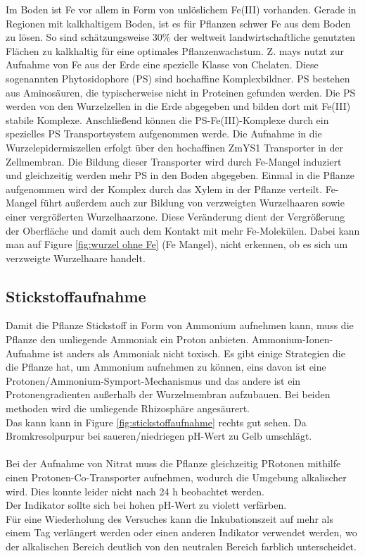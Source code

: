 \documentclass[10pt,a4paper]{article}
\begin{document}
	Im Boden ist Fe vor allem in Form von unlöslichem Fe(III) vorhanden. Gerade in Regionen mit kalkhaltigem Boden, ist es für Pflanzen schwer Fe aus dem Boden zu lösen. So sind schätzungsweise 30$\%$ der weltweit landwirtschaftliche genutzten Flächen zu kalkhaltig für eine optimales Pflanzenwachstum\cite{Barker}. Z. mays nutzt zur Aufnahme von Fe aus der Erde eine spezielle Klasse von Chelaten. Diese sogenannten Phytosidophore (PS) sind hochaffine Komplexbildner. PS bestehen aus Aminosäuren, die typischerweise nicht in Proteinen gefunden werden. Die PS werden von den Wurzelzellen in die Erde abgegeben und bilden dort mit Fe(III) stabile Komplexe. Anschließend können die PS-Fe(III)-Komplexe durch ein spezielles PS Transportsystem aufgenommen werde\cite{Taiz}. Die Aufnahme in die Wurzelepidermiszellen erfolgt über den hochaffinen ZmYS1 Transporter in der Zellmembran\cite{Schaaf;}. Die Bildung dieser Transporter wird durch Fe-Mangel induziert und gleichzeitig werden mehr PS in den Boden abgegeben. Einmal in die Pflanze aufgenommen wird der Komplex durch das Xylem in der Pflanze verteilt\cite{Taiz}.  Fe-Mangel führt außerdem auch zur Bildung von verzweigten Wurzelhaaren sowie einer vergrößerten Wurzelhaarzone. Diese Veränderung dient der Vergrößerung der Oberfläche und damit auch dem Kontakt mit mehr Fe-Molekülen. Dabei kann man auf Figure \ref{fig:wurzel ohne Fe} (Fe Mangel), nicht erkennen, ob es sich um verzweigte Wurzelhaare handelt. 
	
	\subsection{Stickstoffaufnahme}
	Damit die Pflanze Stickstoff in Form von Ammonium aufnehmen kann, muss die Pflanze den umliegende Ammoniak ein Proton anbieten. Ammonium-Ionen-Aufnahme ist anders als Ammoniak nicht toxisch. Es gibt einige Strategien die die Pflanze hat, um Ammonium aufnehmen zu können, eins davon ist eine Protonen/Ammonium-Symport-Mechanismus und das andere ist ein Protonengradienten außerhalb der Wurzelmembran aufzubauen. Bei beiden methoden wird die umliegende Rhizosphäre angesäurert.\\
	Das kann kann in Figure \ref{fig:stickstoffaufnahme} rechts gut sehen. Da Bromkresolpurpur bei saueren/niedriegen pH-Wert zu Gelb umschlägt.\\
	\\
	Bei der Aufnahme von Nitrat muss die Pflanze gleichzeitig PRotonen mithilfe einen Protonen-Co-Transporter aufnehmen, wodurch die Umgebung alkalischer wird. Dies konnte leider nicht nach 24 h beobachtet werden.\\
	Der Indikator sollte sich bei hohen pH-Wert zu violett verfärben. \\
	Für eine Wiederholung des Versuches kann die Inkubationszeit auf mehr als einem Tag verlängert werden oder einen anderen Indikator verwendet werden, wo der alkalischen Bereich deutlich von den neutralen Bereich farblich unterscheidet.
	
	
	\nocite{*}
	
	\newpage
	
	
\end{document}
